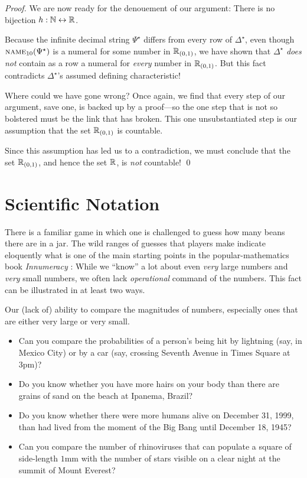 \begin{proof}
We are now ready for the denouement of our argument: There is no bijection $h: \mathbb{N} \leftrightarrow \mathbb{R}$.

\smallskip

Because the infinite decimal string $\Psi^\star$ differs from every row of $\Delta^\star$, even though $\mbox{\sc name}_{10}(\Psi^\star)$ is a numeral for some number in $\mathbb{R}_{(0,1)}$, we
have shown that $\Delta^\star$ {\em does not} contain as a row a numeral for {\em every} number in $\mathbb{R}_{(0,1)}$.  But this fact contradicts $\Delta^\star$'s assumed defining characteristic!

\medskip

Where could we have gone wrong?  Once again, we find that every step of our argument, save one, is backed up by a proof---so the one step that is not so bolstered must be the link that has broken.  This one unsubstantiated step is our assumption that the set $\mathbb{R}_{(0,1)}$ is countable.  

\medskip

Since this assumption has led us to a contradiction, we must conclude that the set $\mathbb{R}_{(0,1)}$, and hence the set $\mathbb{R}$, is {\em not} countable!  \qed
\end{proof}



\section{Scientific Notation}
\label{sec:scientific-notation}

There is a familiar game in which one is challenged to guess how many beans there are in a jar.  The wild ranges of guesses that players make indicate eloquently what is one of the main starting points in the popular-mathematics book {\it Innumeracy} \cite{Paulos}: While we ``know''
a lot about even {\em very} large numbers and {\em very} small numbers, we often lack {\em operational} command of the numbers.  This fact can be illustrated in at least two ways.

\bigskip

Our (lack of) ability to compare the magnitudes of numbers, especially ones that are either very large or very small.
\begin{itemize}
\item
Can you compare the probabilities of a person's being hit by lightning (say, in Mexico City) or by a car (say, crossing Seventh Avenue in Times Square at 3pm)?
\medskip\item
Do you know whether you have more hairs on your body than there are grains of sand on the beach at Ipanema, Brazil?
\medskip\item
Do you know whether there were more humans alive on December 31, 1999, than had lived from the moment of the Big Bang until December 18, 1945?
\medskip\item
Can you compare the number of rhinoviruses that can populate a square of side-length $1$mm with the number of stars visible on a clear night at the summit of Mount Everest?
\end{itemize}


